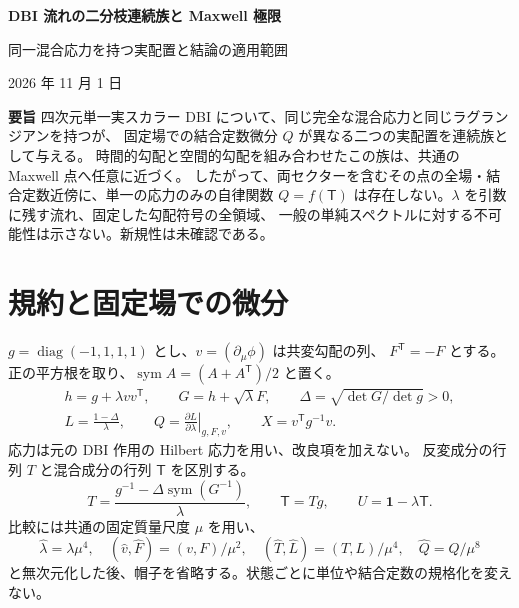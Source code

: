 \documentclass[11pt,a4paper]{article}
\newcommand{\sym}{\operatorname{sym}}
\newcommand{\diag}{\operatorname{diag}}
\newcommand{\Id}{\mathbf 1}
\newcommand{\Tmix}{\mathsf T}
\begin{document}
\begin{center}
{\Large\bfseries DBI 流れの二分枝連続族と Maxwell 極限}\par
\vspace{4pt}
{\large 同一混合応力を持つ実配置と結論の適用範囲}\par
\vspace{4pt}
2026 年 11 月 1 日
\end{center}
\noindent\textbf{要旨}\quad
四次元単一実スカラー DBI について、同じ完全な混合応力と同じラグランジアンを持つが、
固定場での結合定数微分 $Q$ が異なる二つの実配置を連続族として与える。
時間的勾配と空間的勾配を組み合わせたこの族は、共通の Maxwell 点へ任意に近づく。
したがって、両セクターを含むその点の全場・結合定数近傍に、単一の応力のみの自律関数
$Q=f(\Tmix)$ は存在しない。$\lambda$ を引数に残す流れ、固定した勾配符号の全領域、
一般の単純スペクトルに対する不可能性は示さない。新規性は未確認である。

\section{規約と固定場での微分}
$g=\diag(-1,1,1,1)$ とし、$v=(\partial_\mu\phi)$ は共変勾配の列、
$F^{\mathsf T}=-F$ とする。正の平方根を取り、$\sym A=(A+A^{\mathsf T})/2$ と置く。
\begin{equation}\label{eq:def}
\begin{gathered}
h=g+\lambda vv^{\mathsf T},\qquad G=h+\sqrt\lambda F,\qquad
\Delta=\sqrt{\det G/\det g}>0,\\
L=\frac{1-\Delta}{\lambda},\qquad
Q=\left.\frac{\partial L}{\partial\lambda}\right|_{g,F,v},\qquad
X=v^{\mathsf T}g^{-1}v .
\end{gathered}
\end{equation}
応力は元の DBI 作用の Hilbert 応力を用い、改良項を加えない。
反変成分の行列 $T$ と混合成分の行列 $\Tmix$ を区別する。
\begin{equation}\label{eq:stress}
T=\frac{g^{-1}-\Delta\sym(G^{-1})}{\lambda},\qquad
\Tmix=Tg,\qquad U=\Id-\lambda\Tmix .
\end{equation}
比較には共通の固定質量尺度 $\mu$ を用い、
\begin{equation}\label{eq:units}
\widehat\lambda=\lambda\mu^4,\quad
(\widehat v,\widehat F)=(v,F)/\mu^2,\quad
(\widehat T,\widehat L)=(T,L)/\mu^4,\quad
\widehat Q=Q/\mu^8
\end{equation}
と無次元化した後、帽子を省略する。状態ごとに単位や結合定数の規格化を変えない。
\end{document}
